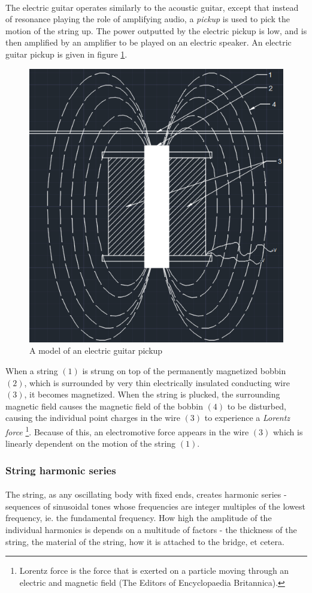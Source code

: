 \documentclass{article}
\begin{document}
\paragraph*{}
The electric guitar operates similarly to the acoustic guitar, except that 
instead of resonance playing the role of amplifying audio, a \textit{pickup} 
is used to pick the motion of the string up. The power outputted by the 
electric pickup is low, and is then amplified by an amplifier to be played on 
an electric speaker. An electric guitar pickup is given in figure 
\ref{fig:pickup}. 
\begin{figure}[ht]
	\centering
	\includegraphics[width=.4\textwidth]{img/pickup}
	\caption{A model of an electric guitar pickup}
	\label{fig:pickup}
\end{figure}
When a string $(1)$ is strung on top of the permanently magnetized bobbin 
$(2)$, which is surrounded by very thin electrically insulated conducting wire 
$(3)$, it becomes magnetized. When the string is plucked, the surrounding 
magnetic field causes the magnetic field of the bobbin $(4)$ to be disturbed, 
causing the individual point charges in the wire $(3)$ to experience a 
\textit{Lorentz force}
\footnote{Lorentz force is the force that is exerted on a particle moving 
	through an electric and magnetic field (The Editors of Encyclopaedia 
Britannica).}. Because of this, an electromotive force appears in the wire 
$(3)$ which is linearly dependent on the motion of the string $(1)$.

\subsubsection{String harmonic series}
\paragraph*{} 
The string, as any oscillating body with fixed ends, creates harmonic series - 
sequences of sinusoidal tones whose frequencies are integer multiples of the 
lowest frequency, ie. the fundamental frequency. How high the amplitude of the 
individual harmonics is depends on a multitude of factors - the thickness of 
the string, the material of the string, how it is attached to the bridge, 
et cetera.
\end{document}
